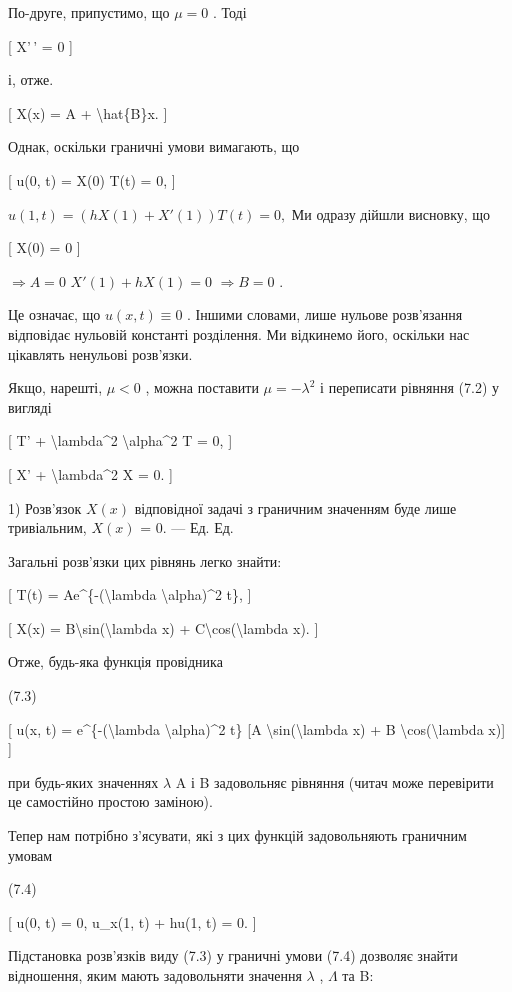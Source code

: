 \documentclass[
]{article}
\begin{document}
По-друге, припустимо, що \(\mu = 0\) . Тоді

{[} X'\,' = 0 {]}

і, отже.

{[} X(x) = A + \textbackslash hat\{B\}x. {]}

Однак, оскільки граничні умови вимагають, що

{[} u(0, t) = X(0) T(t) = 0, {]}

\(u(1, t) = (hX(1) + X'(1)) T(t) = 0,\) Ми одразу дійшли висновку, що

{[} X(0) = 0 {]}

\(\Rightarrow A = 0\) \(X'(1) + hX(1) = 0\) \(\Rightarrow B = 0\) .

Це означає, що \(u(x, t) \equiv 0\) . Іншими словами, лише нульове
розв'язання відповідає нульовій константі розділення. Ми відкинемо його,
оскільки нас цікавлять ненульові розв'язки.

Якщо, нарешті, \(\mu < 0\) , можна поставити \(\mu = -\lambda^2\) і
переписати рівняння (7.2) у вигляді

{[} T' + \textbackslash lambda\^{}2 \textbackslash alpha\^{}2 T = 0, {]}

{[} X' + \textbackslash lambda\^{}2 X = 0. {]}

1) Розв'язок \(X(x)\) відповідної задачі з граничним значенням буде лише
тривіальним, \(X(x)\) = 0. --- Ед. Ед.

Загальні розв'язки цих рівнянь легко знайти:

{[} T(t) = Ae\^{}\{-(\textbackslash lambda \textbackslash alpha)\^{}2
t\}, {]}

{[} X(x) = B\textbackslash sin(\textbackslash lambda x) +
C\textbackslash cos(\textbackslash lambda x). {]}

Отже, будь-яка функція провідника

(7.3)

{[} u(x, t) = e\^{}\{-(\textbackslash lambda \textbackslash alpha)\^{}2
t\} {[}A \textbackslash sin(\textbackslash lambda x) + B
\textbackslash cos(\textbackslash lambda x){]} {]}

при будь-яких значеннях \(\lambda\) A і B задовольняє рівняння (читач
може перевірити це самостійно простою заміною).

Тепер нам потрібно з'ясувати, які з цих функцій задовольняють граничним
умовам

(7.4)

{[} u(0, t) = 0, u\_x(1, t) + hu(1, t) = 0. {]}

Підстановка розв'язків виду (7.3) у граничні умови (7.4) дозволяє знайти
відношення, яким мають задовольняти значення \(\lambda\) , \(\Lambda\)
та B:
\end{document}
